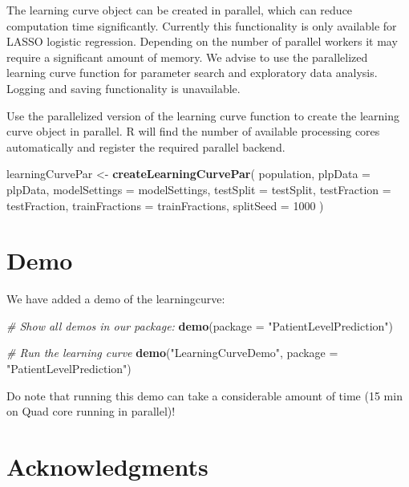 \documentclass[
]{article}
\newenvironment{Shaded}{\begin{snugshade}}{\end{snugshade}}
\newcommand{\CommentTok}[1]{\textcolor[rgb]{0.56,0.35,0.01}{\textit{#1}}}
\newcommand{\DataTypeTok}[1]{\textcolor[rgb]{0.13,0.29,0.53}{#1}}
\newcommand{\DecValTok}[1]{\textcolor[rgb]{0.00,0.00,0.81}{#1}}
\newcommand{\KeywordTok}[1]{\textcolor[rgb]{0.13,0.29,0.53}{\textbf{#1}}}
\newcommand{\NormalTok}[1]{#1}
\newcommand{\StringTok}[1]{\textcolor[rgb]{0.31,0.60,0.02}{#1}}
\begin{document}
The learning curve object can be created in parallel, which can reduce
computation time significantly. Currently this functionality is only
available for LASSO logistic regression. Depending on the number of
parallel workers it may require a significant amount of memory. We
advise to use the parallelized learning curve function for parameter
search and exploratory data analysis. Logging and saving functionality
is unavailable.

Use the parallelized version of the learning curve function to create
the learning curve object in parallel. R will find the number of
available processing cores automatically and register the required
parallel backend.

\begin{Shaded}
\begin{Highlighting}[]
\NormalTok{learningCurvePar <-}\StringTok{ }\KeywordTok{createLearningCurvePar}\NormalTok{(}
\NormalTok{  population,}
  \DataTypeTok{plpData =}\NormalTok{  plpData,}
  \DataTypeTok{modelSettings =}\NormalTok{ modelSettings,}
  \DataTypeTok{testSplit =}\NormalTok{ testSplit,}
  \DataTypeTok{testFraction =}\NormalTok{ testFraction,}
  \DataTypeTok{trainFractions =}\NormalTok{ trainFractions,}
  \DataTypeTok{splitSeed =} \DecValTok{1000}
\NormalTok{)}
\end{Highlighting}
\end{Shaded}

\hypertarget{demo}{%
\section{Demo}\label{demo}}

We have added a demo of the learningcurve:

\begin{Shaded}
\begin{Highlighting}[]
\CommentTok{# Show all demos in our package: }
 \KeywordTok{demo}\NormalTok{(}\DataTypeTok{package =} \StringTok{"PatientLevelPrediction"}\NormalTok{)}

\CommentTok{# Run the learning curve}
 \KeywordTok{demo}\NormalTok{(}\StringTok{"LearningCurveDemo"}\NormalTok{, }\DataTypeTok{package =} \StringTok{"PatientLevelPrediction"}\NormalTok{)}
\end{Highlighting}
\end{Shaded}

Do note that running this demo can take a considerable amount of time
(15 min on Quad core running in parallel)!

\hypertarget{acknowledgments}{%
\section{Acknowledgments}\label{acknowledgments}}
\end{document}
